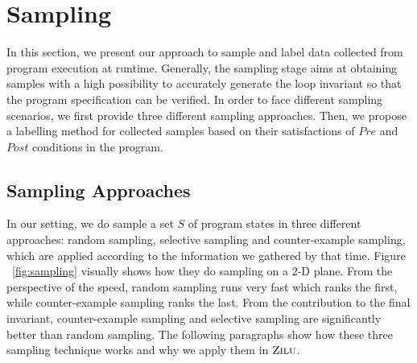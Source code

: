 
\section{Sampling} %
\label{sec:sampling}

In this section, we present our approach to sample and label data 
collected from program execution at runtime. 
Generally, the sampling stage aims at obtaining samples with a high possibility to 
accurately generate the loop invariant so that the program specification can be verified. 
In order to face different sampling scenarios, 
we first provide three different sampling approaches. 
Then, we propose a labelling method for collected samples 
based on their satisfactions of $\mathit{Pre}$ and $\mathit{Post}$ conditions in the program. 

\subsection{Sampling Approaches} %
\label{sub:sampling_approaches}

In our setting, we do sample a set $S$ of program states in three different approaches: 
random sampling, selective sampling and counter-example sampling, 
which are applied according to the information we gathered by that time.
Figure ~\ref{fig:sampling} visually shows how they do sampling on a 2-D plane.
From the perspective of the speed, random sampling runs very fast which ranks the first, 
while counter-example sampling ranks the last.
From the contribution to the final invariant,
counter-example sampling and selective sampling are significantly better than random sampling.
The following paragraphs show how these three sampling technique works and why we apply them in $\textsc{Zilu}$.

